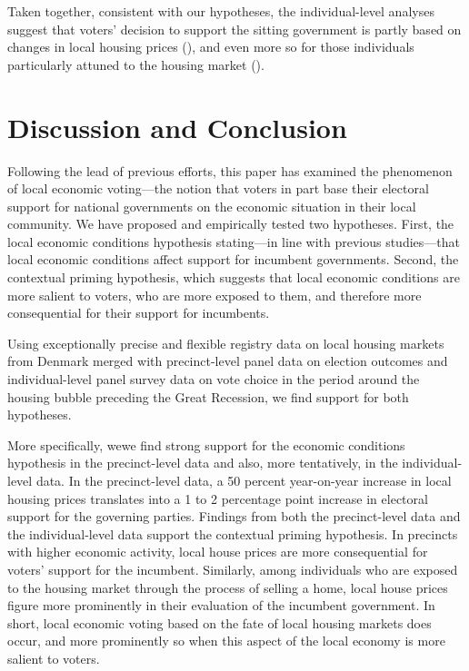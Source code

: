 \documentclass[12pt,a4paper]{article}
\begin{document}
	Taken together, consistent with our hypotheses, the individual-level analyses suggest that voters' decision to support the sitting government is partly based on changes in local housing prices (\hone), and even more so for those individuals particularly attuned to the housing market (\htwo). 
	
	\section{Discussion and Conclusion}
	Following  the lead of previous efforts, this paper has examined the phenomenon of local economic voting—the notion that voters in part base their electoral support for national governments on the economic situation in their local community. We have proposed and empirically tested two hypotheses. First, the local economic conditions hypothesis stating—in line with previous studies—that local economic conditions affect support for incumbent governments. Second, the contextual priming hypothesis, which suggests that local economic conditions are more salient to voters, who are more exposed to them, and therefore more consequential for their support for incumbents. 
	
	Using exceptionally precise and flexible registry data on local housing markets from Denmark merged with precinct-level panel data on election outcomes and individual-level panel survey data on vote choice in the period around the housing bubble preceding the Great Recession, we find support for both hypotheses.
	
	
	More specifically, wewe find strong support for the economic conditions hypothesis in the precinct-level data and also, more tentatively, in the individual-level data. In the precinct-level data, a 50 percent year-on-year increase in local housing prices translates into a 1 to 2 percentage point increase in electoral support for the governing parties. Findings from both the precinct-level data and the individual-level data support the contextual priming hypothesis. In precincts with higher economic activity, local house prices are more consequential for voters’ support for the incumbent. Similarly, among individuals who are exposed to the housing market through the process of selling a home, local house prices figure more prominently in their evaluation of the incumbent government. In short, local economic voting based on the fate of local housing markets does occur, and more prominently so when this aspect of the local economy is more salient to voters.
	
\end{document}
